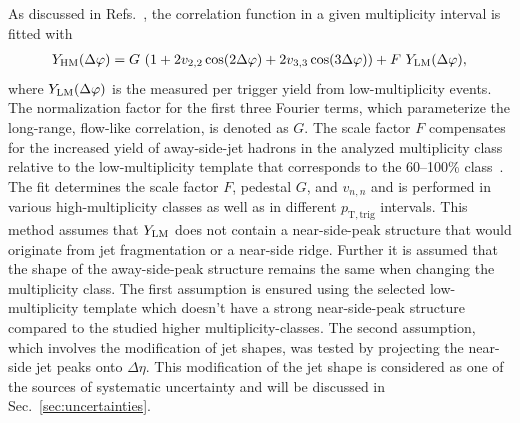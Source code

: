 As discussed in Refs.~\cite{ATLAS:2015hzw,ATLAS:2016yzd}, the correlation function in a given multiplicity interval is fitted with 
\begin{eqnarray}
\label{eq:narray}
Y_{\rm{HM}}(\Delta\varphi) = G~(1 + 2v_{2,2}\cos(2\Delta\varphi) + 2v_{3,3}\cos(3\Delta\varphi)) + F~Y_{\rm{LM}}(\Delta\varphi),
\label{eq:tmpfit}
\end{eqnarray}
where $Y_{\rm{LM}}(\Delta\varphi)$ is the measured per trigger yield from low-multiplicity events. The normalization factor for the first three Fourier terms, which parameterize the long-range, flow-like correlation, is denoted as $G$. The scale factor $F$ compensates for the increased yield of away-side-jet hadrons in the analyzed multiplicity class relative to the low-multiplicity template that corresponds to the 60--100\% class~\cite{ALICE:2013tla,ALICE:2014mas}.
The fit determines the scale factor $F$, pedestal $G$, and $v_{n,n}$ and is performed in various high-multiplicity classes as well as in different $p_\mathrm{T,trig}$ intervals. 
This method assumes that $Y_{\rm{LM}}$ does not contain a near-side-peak structure that would originate from jet fragmentation or a near-side ridge.
Further it is assumed that the shape of the away-side-peak structure remains the same when changing the multiplicity class.
The first assumption is ensured using the selected low-multiplicity template which doesn't have a strong near-side-peak structure compared to the studied higher multiplicity-classes. The second assumption, which involves the modification of jet shapes, was tested by projecting the near-side jet peaks onto $\Delta\eta$. 
This modification of the jet shape is considered as one of the sources of systematic uncertainty and will be discussed in Sec.~\ref{sec:uncertainties}.

